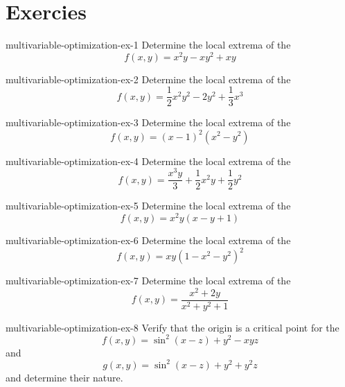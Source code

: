 \documentclass[preview]{standalone}
\begin{document}
\genpage

\section{Exercies}

\begin{snippetexercise}{multivariable-optimization-ex-1}{}
    Determine the local extrema of the \function
    \[
        f(x,y) = x^2y - xy^2 + xy
    \]
\end{snippetexercise}

\begin{snippetexercise}{multivariable-optimization-ex-2}{}
    Determine the local extrema of the \function
    \[
        f(x,y) = \frac{1}{2}x^2y^2 - 2y^2 + \frac{1}{3}x^3
    \]
\end{snippetexercise}

\begin{snippetexercise}{multivariable-optimization-ex-3}{}
    Determine the local extrema of the \function
    \[
        f(x,y) = {(x-1)}^2 (x^2 - y^2)
    \]
\end{snippetexercise}

\begin{snippetexercise}{multivariable-optimization-ex-4}{}
    Determine the local extrema of the \function
    \[
        f(x,y) = \frac{x^3y}{3} + \frac{1}{2}x^2y + \frac{1}{2}y^2
    \]
\end{snippetexercise}

\begin{snippetexercise}{multivariable-optimization-ex-5}{}
    Determine the local extrema of the \function
    \[
        f(x,y) = x^2y(x-y+1)
    \]
\end{snippetexercise}

\begin{snippetexercise}{multivariable-optimization-ex-6}{}
    Determine the local extrema of the \function
    \[
        f(x,y) = xy{(1-x^2-y^2)}^2
    \]
\end{snippetexercise}

\begin{snippetexercise}{multivariable-optimization-ex-7}{}
    Determine the local extrema of the \function
    \[
        f(x,y) = \frac{x^2 + 2y}{x^2 + y^2 + 1}
    \]
\end{snippetexercise}

\begin{snippetexercise}{multivariable-optimization-ex-8}{}
    Verify that the origin is a critical point for the \function[functions]
    \[
        f(x,y) = \sin^2(x-z) + y^2 - xyz
    \]
    and
    \[
        g(x,y) = \sin^2(x-z) + y^2 + y^2z
    \]
    and determine their nature.
\end{snippetexercise}
\end{document}
